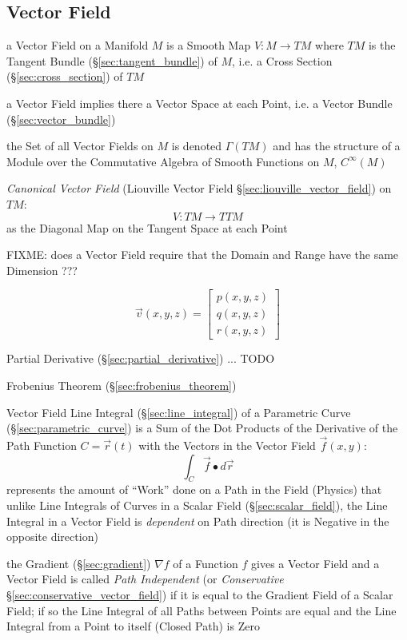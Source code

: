 \subsection{Vector Field}\label{sec:vector_field}

a Vector Field on a Manifold $M$ is a Smooth Map $V : M \rightarrow T M$ where
$TM$ is the Tangent Bundle (\S\ref{sec:tangent_bundle}) of $M$, i.e. a Cross
Section (\S\ref{sec:cross_section}) of $TM$

\fist a Vector Field implies there a Vector Space at each Point, i.e. a Vector
Bundle (\S\ref{sec:vector_bundle})

the Set of all Vector Fields on $M$ is denoted $\Gamma(TM)$ and has the
structure of a Module over the Commutative Algebra of Smooth Functions on $M$,
$C^\infty(M)$

\emph{Canonical Vector Field} (Liouville Vector Field
\S\ref{sec:liouville_vector_field}) on $TM$:
\[
  V : TM \rightarrow TTM
\]
as the Diagonal Map on the Tangent Space at each Point

FIXME: does a Vector Field require that the Domain and Range have the same
Dimension ???

\begin{equation*}
  \vec{v}(x,y,z) = \begin{bmatrix}
    p(x,y,z) \\
    q(x,y,z) \\
    r(x,y,z)
  \end{bmatrix}
\end{equation*}

Partial Derivative (\S\ref{sec:partial_derivative}) ... TODO

Frobenius Theorem (\S\ref{sec:frobenius_theorem})

Vector Field Line Integral (\S\ref{sec:line_integral}) of a Parametric Curve
(\S\ref{sec:parametric_curve}) is a Sum of the Dot Products of the Derivative
of the Path Function $C = \vec{r}(t)$ with the Vectors in the Vector Field
$\vec{f}(x,y)$:
\[
  \int_C \vec{f} \bullet d\vec{r}
\]
represents the amount of ``Work'' done on a Path in the Field (Physics)
that unlike Line Integrals of Curves in a Scalar Field
(\S\ref{sec:scalar_field}), the Line Integral in a Vector Field is
\emph{dependent} on Path direction (it is Negative in the opposite direction)

the Gradient (\S\ref{sec:gradient}) $\nabla f$ of a Function $f$ gives a Vector
Field and a Vector Field is called \emph{Path Independent} (or
\emph{Conservative} \S\ref{sec:conservative_vector_field}) if it is equal to
the Gradient Field of a Scalar Field; if so the Line Integral of all Paths
between Points are equal and the Line Integral from a Point to itself (Closed
Path) is Zero

